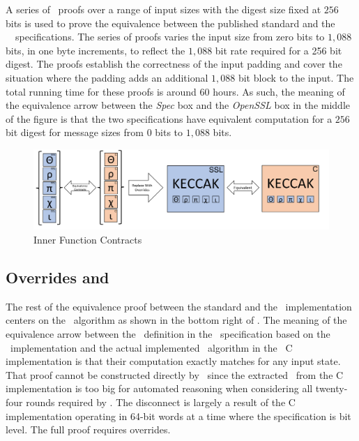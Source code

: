 A series of \saw\ proofs over a range of input sizes with the digest size fixed at $256$ bits is used to prove the equivalence between the published standard and the \openssl\ \cryptol\ specifications.
The series of proofs varies the input size from zero bits to $1,088$ bits, in one byte increments, to reflect the $1,088$ bit rate required for a 256 bit digest.
The proofs establish the correctness of the input padding and cover the situation where the padding adds an additional $1,088$ bit block to the input.
The total running time for these proofs is around 60 hours.
As such, the meaning of the equivalence arrow between the \emph{Spec} box and the \emph{OpenSSL} box in the middle of the figure is that the two specifications have equivalent computation for a $256$ bit digest for message sizes from $0$ bits to $1,088$ bits.

\begin{figure}[t]
  \centering
  \includegraphics[width=\linewidth]{figs/proof2.png}
  
  \caption{Inner Function Contracts}
  \label{fig:proofStructure2}
  
\end{figure}

\subsection{Overrides and \keccak}

The rest of the equivalence proof between the standard and the \openssl\ implementation centers on the \keccak\ algorithm as shown in the bottom right of .
The meaning of the equivalence arrow between the \keccak\ definition in the \cryptol\ specification based on the \openssl\ implementation and the actual implemented \keccak\ algorithm in the \openssl\ C implementation is that their computation exactly matches for any input state.
That proof cannot be constructed directly by \saw\ since the extracted \sawcore\ from the C implementation is too big for automated reasoning when considering all twenty-four rounds required by \keccak.
The disconnect is largely a result of the C implementation operating in 64-bit words at a time where the specification is bit level.
The full proof requires overrides.


